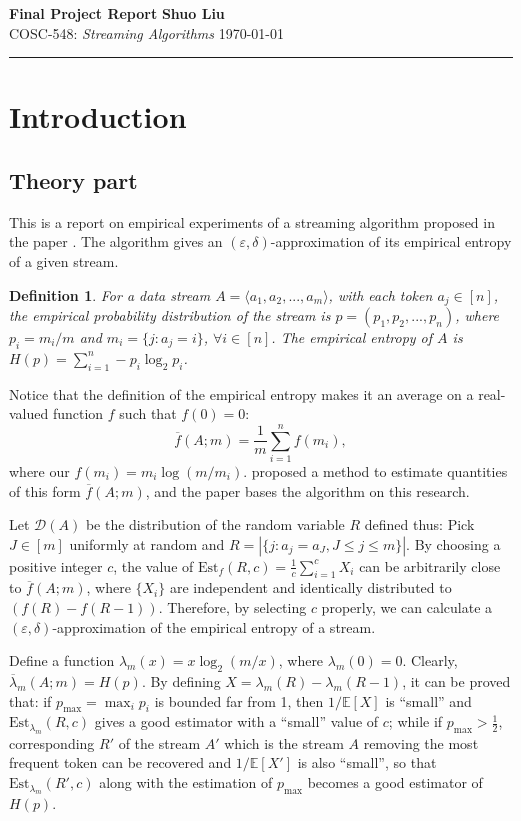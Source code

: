 \documentclass{scrartcl}
\newcommand{\E}[1]{\mathbb{E}\left[#1\right]}
\newtheorem{definition}{Definition}
\begin{document}
\pagestyle{plain}
\noindent
\large\textbf{Final Project Report} \hfill \textbf{Shuo Liu} \\
\normalsize COSC-548: \emph{Streaming Algorithms} \hfill \today 
\vspace{-5pt}
\noindent\rule{\textwidth}{0.5pt}

\section{Introduction}

\subsection{Theory part} %
\label{sub:theory_part}

This is a report on empirical experiments of a streaming algorithm proposed in the paper \citep{chakrabarti2010near}. The algorithm gives an $(\varepsilon,\delta)$-approximation of its empirical entropy of a given stream. 

\begin{definition}
For a data stream $A=\langle a_1, a_2,...,a_m\rangle$, with each \emph{token} $a_j\in[n]$, the \emph{empirical probability distribution} of the stream is $p=(p_1,p_2,...,p_n)$, where $p_i=m_i/m$ and $m_i=\{j:a_j=i\}$, $\forall i\in[n]$. The \emph{empirical entropy} of $A$ is $H(p)=\sum_{i=1}^n-p_i\log_2{p_i}$.
\end{definition}

Notice that the definition of the empirical entropy makes it an average on a real-valued function $f$ such that $f(0)=0$:
$$\overline{f}(A;m)=\frac{1}{m}\sum_{i=1}^nf(m_i),$$
where our $f(m_i)=m_i\log(m/m_i)$. \citet{Alon:1996:SCA:237814.237823} proposed a method to estimate quantities of this form $\overline{f}(A;m)$, and the paper \citep{chakrabarti2010near} bases the algorithm on this research.

Let $\mathcal{D}(A)$ be the distribution of the random variable $R$ defined thus: Pick $J\in[m]$ uniformly at random and $R=|\{j:a_j=a_J, J\leq j\leq m\}|$. By choosing a positive integer $c$, the value of $\textrm{Est}_f(R,c)=\frac{1}{c}\sum_{i=1}^cX_i$ can be arbitrarily close to $\overline{f}(A;m)$, where $\{X_i\}$ are independent and identically distributed to $(f(R)-f(R-1))$. Therefore, by selecting $c$ properly, we can calculate a $(\varepsilon, \delta)$-approximation of the empirical entropy of a stream.

Define a function $\lambda_m(x)=x\log_2(m/x)$, where $\lambda_m(0)=0$. Clearly, $\overline{\lambda}_m(A;m)=H(p)$. By defining $X=\lambda_m(R)-\lambda_m(R-1)$, it can be proved that: if $p_{\max}=\max_ip_i$ is bounded far from 1, then $1/\E{X}$ is ``small'' and $\textrm{Est}_{\lambda_m}(R,c)$ gives a good estimator with a ``small'' value of $c$; while if $p_{\max}>\frac{1}{2}$, corresponding $R'$ of the stream $A'$ which is the stream $A$ removing the most frequent token can be recovered and $1/\E{X'}$ is also ``small'', so that $\textrm{Est}_{\lambda_m}(R',c)$ along with the estimation of $p_{\max}$ becomes a good estimator of $H(p)$.
\end{document}
